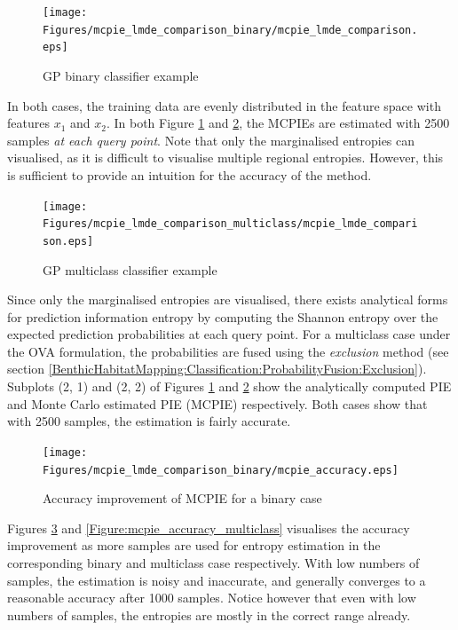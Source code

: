 			\begin{figure}[!htbp]
				\centering
					\texttt{[image: Figures/mcpie\_lmde\_comparison\_binary/mcpie\_lmde\_comparison.eps]}
				\caption{GP binary classifier example}
				\label{Figure:mcpie_lmde_comparison_binary}
			\end{figure}			
						
			In both cases, the training data are evenly distributed in the feature space with features $x_{1}$ and $x_{2}$. In both Figure \ref{Figure:mcpie_lmde_comparison_binary} and \ref{Figure:mcpie_lmde_comparison_multiclass}, the MCPIEs are estimated with 2500 samples \textit{at each query point}. Note that only the marginalised entropies can visualised, as it is difficult to visualise multiple regional entropies. However, this is sufficient to provide an intuition for the accuracy of the method.
			
			\begin{figure}[!htbp]
				\centering
					\texttt{[image: Figures/mcpie\_lmde\_comparison\_multiclass/mcpie\_lmde\_comparison.eps]}
				\caption{GP multiclass classifier example}
				\label{Figure:mcpie_lmde_comparison_multiclass}
			\end{figure}
			
			Since only the marginalised entropies are visualised, there exists analytical forms for prediction information entropy by computing the Shannon entropy over the expected prediction probabilities at each query point. For a multiclass case under the OVA formulation, the probabilities are fused using the \textit{exclusion} method (see section  \ref{BenthicHabitatMapping:Classification:ProbabilityFusion:Exclusion}). Subplots (2, 1) and (2, 2) of Figures \ref{Figure:mcpie_lmde_comparison_binary} and \ref{Figure:mcpie_lmde_comparison_multiclass} show the analytically computed PIE and Monte Carlo estimated PIE (MCPIE) respectively. Both cases show that with 2500 samples, the estimation is fairly accurate.
			
			\begin{figure}[!htbp]
				\centering
					\texttt{[image: Figures/mcpie\_lmde\_comparison\_binary/mcpie\_accuracy.eps]}
				\caption{Accuracy improvement of MCPIE for a binary case}
				\label{Figure:mcpie_accuracy_binary}
			\end{figure}
				
			Figures \ref{Figure:mcpie_accuracy_binary} and \ref{Figure:mcpie_accuracy_multiclass} visualises the accuracy improvement as more samples are used for entropy estimation in the corresponding binary and multiclass case respectively. With low numbers of samples, the estimation is noisy and inaccurate, and generally converges to a reasonable accuracy after 1000 samples. Notice however that even with low numbers of samples, the entropies are mostly in the correct range already.
			
